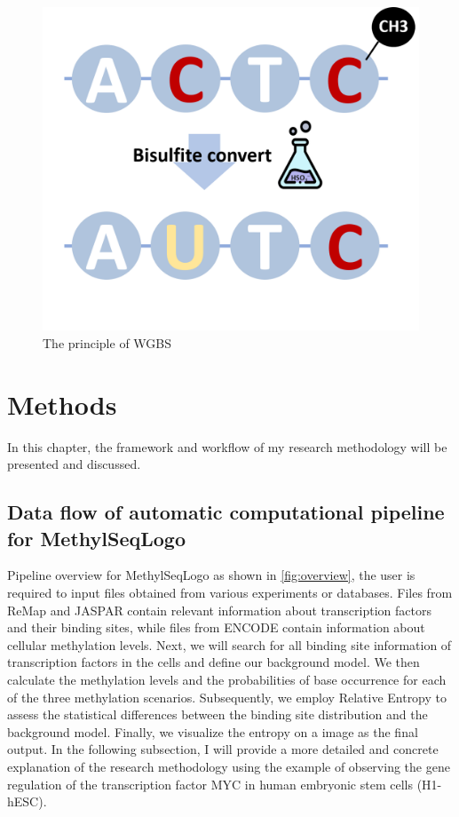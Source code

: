 \documentclass{PHlab-thesis}
\begin{document}
\begin{figure}[H]
	\centering
	\includegraphics[scale=0.65]{figures/wgbs.png}
	\caption{The principle of WGBS}
	\label{fig:wgbs} %
\end{figure}

\chapter{Methods}
In this chapter, the framework and workflow of my research methodology will be presented and discussed.
\section{Data flow of automatic computational pipeline for MethylSeqLogo}
Pipeline overview for MethylSeqLogo as shown in \ref{fig:overview}, the user is required to input files obtained from various experiments or databases. Files from ReMap and JASPAR contain relevant information about transcription factors and their binding sites, while files from ENCODE contain information about cellular methylation levels. Next, we will search for all binding site information of transcription factors in the cells and define our background model. We then calculate the methylation levels and the probabilities of base occurrence for each of the three methylation scenarios. Subsequently, we employ Relative Entropy to assess the statistical differences between the binding site distribution and the background model. Finally, we visualize the entropy on a image as the final output. In the following subsection, I will provide a more detailed and concrete explanation of the research methodology using the example of observing the gene regulation of the transcription factor MYC in human embryonic stem cells (H1-hESC).
\end{document}
